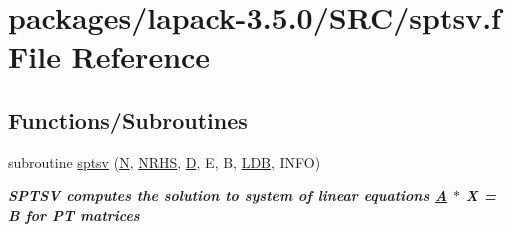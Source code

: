 \hypertarget{sptsv_8f}{}\section{packages/lapack-\/3.5.0/\+S\+R\+C/sptsv.f File Reference}
\label{sptsv_8f}
\subsection*{Functions/\+Subroutines}
\begin{DoxyCompactItemize}
\item 
subroutine \hyperlink{group__realPTsolve_ga4b54ec5cf63547490c2a0258036b7f72}{sptsv} (\hyperlink{polmisc_8c_a0240ac851181b84ac374872dc5434ee4}{N}, \hyperlink{example__user_8c_aa0138da002ce2a90360df2f521eb3198}{N\+R\+H\+S}, \hyperlink{odrpack_8h_a7dae6ea403d00f3687f24a874e67d139}{D}, E, B, \hyperlink{example__user_8c_a50e90a7104df172b5a89a06c47fcca04}{L\+D\+B}, I\+N\+F\+O)
\begin{DoxyCompactList}\small\item\em {\bfseries  S\+P\+T\+S\+V computes the solution to system of linear equations \hyperlink{classA}{A} $\ast$ X = B for P\+T matrices} \end{DoxyCompactList}\end{DoxyCompactItemize}
